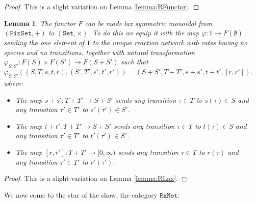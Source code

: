 \documentclass{compositionalityarticle}
\newcommand{\FinSet}{\mathtt{FinSet}}
\newcommand{\Set}{\mathtt{Set}}
\newcommand{\RxNet}{\mathtt{RxNet}}
\newcommand{\maps}{\colon}
\theoremstyle{plain}
\newtheorem{lem}[thm]{Lemma}
\theoremstyle{remark}
\begin{document}
\begin{proof}
This is a slight variation on Lemma \ref{lemma:RFunctor}.
\end{proof}

\begin{lem}
\label{lemma:RxLax}
The functor $F$ can be made lax symmetric monoidal from $(\FinSet, +)$ to $(\Set, \times)$.  To do this we equip it with the map $\varphi \maps 1 \to F(\emptyset)$ sending the one element of $1$ to the unique reaction network with rates having no species and no transitions, together with natural transformation $\varphi_{S,S'} \maps F(S) \times F(S') \to F(S + S')$ 
such that
\[
    \varphi_{S,S'} ((S,T,s,t,r), (S',T',s',t',r')) = (S + S', T + T', s+s', t+t',[r,r']).  
\]
where:
\begin{itemize}
\item The map $s + s' \maps T + T' \to S + S'$ sends any transition $\tau \in T$ 
to $s(\tau) \in S$ and any transition $\tau' \in T'$ to $s'(\tau') \in S'$.  
\item The map $t + t' \maps T + T' \to S + S'$ sends any transition $\tau \in T$ 
to $t(\tau) \in S$ and any transition $\tau' \in T'$ to $t'(\tau') \in S'$.  
\item The map $[r,r'] \maps T + T' \to [0,\infty)$ sends any transition $\tau \in T$ to $r(\tau)$ and any transition $\tau' \in T'$ to $r'(\tau')$.  
\end{itemize}
\end{lem}

\begin{proof}
This is a slight variation on Lemma \ref{lemma:RLax}. 
\end{proof}

We now come to the star of the show, the category $\RxNet$:
\end{document}
